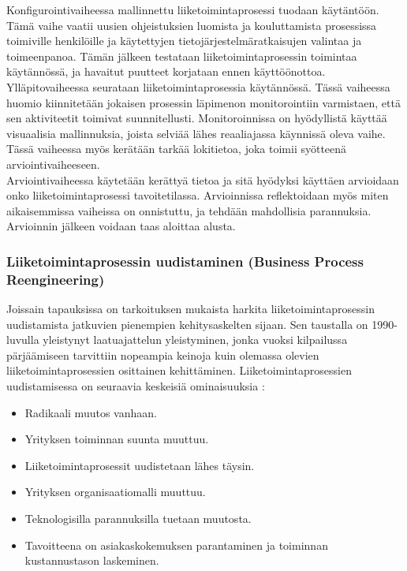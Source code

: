 \documentclass[finnish,12pt,a4paper,pdftex]{article}
\begin{document}
Konfigurointivaiheessa mallinnettu liiketoimintaprosessi tuodaan käytäntöön. Tämä vaihe vaatii uusien ohjeistuksien luomista ja kouluttamista prosessissa toimiville henkilöille ja käytettyjen tietojärjestelmäratkaisujen valintaa ja toimeenpanoa. Tämän jälkeen testataan liiketoimintaprosessin toimintaa käytännössä, ja havaitut puutteet korjataan ennen käyttöönottoa.\\

Ylläpitovaiheessa seurataan liiketoimintaprosessia käytännössä. Tässä vaiheessa huomio kiinnitetään jokaisen prosessin läpimenon monitorointiin varmistaen, että sen aktiviteetit toimivat suunnitellusti. Monitoroinnissa on hyödyllistä käyttää visuaalisia mallinnuksia, joista selviää lähes reaaliajassa käynnissä oleva vaihe. Tässä vaiheessa myös kerätään tarkää lokitietoa, joka toimii syötteenä arviointivaiheeseen.\\

Arviointivaiheessa käytetään kerättyä tietoa ja sitä hyödyksi käyttäen arvioidaan onko liiketoimintaprosessi tavoitetilassa. Arvioinnissa reflektoidaan myös miten aikaisemmissa vaiheissa on onnistuttu, ja tehdään mahdollisia parannuksia. Arvioinnin jälkeen voidaan taas aloittaa alusta.\\

\subsubsection{Liiketoimintaprosessin uudistaminen (Business Process Reengineering)}

Joissain tapauksissa on tarkoituksen mukaista harkita liiketoimintaprosessin uudistamista jatkuvien pienempien kehitysaskelten sijaan. Sen taustalla on 1990-luvulla yleistynyt laatuajattelun yleistyminen, jonka vuoksi kilpailussa pärjäämiseen tarvittiin nopeampia keinoja kuin olemassa olevien liiketoimintaprosessien osittainen kehittäminen. Liiketoimintaprosessien uudistamisessa on seuraavia keskeisiä ominaisuuksia \citep{mohapatra}:

\begin{itemize}
\setlength{\itemsep}{0pt}
    \item Radikaali muutos vanhaan.
    \item Yrityksen toiminnan suunta muuttuu.
    \item Liiketoimintaprosessit uudistetaan lähes täysin.
    \item Yrityksen organisaatiomalli muuttuu.
    \item Teknologisilla parannuksilla tuetaan muutosta.
    \item Tavoitteena on asiakaskokemuksen parantaminen ja toiminnan kustannustason laskeminen.
\end{itemize}
\end{document}
